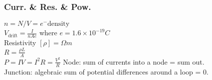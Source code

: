 \subsubsection*{Curr. \& Res. \& Pow.}
$n = N/V = e^- \text{density}$\\
$V_\text{drift} = \frac{I}{nAe}$ where $e = 1.6\times 10^{-19}C$\\
Resistivity $[\rho] = \Omega m$\\
$R = \frac{\rho L}{A}$\\
$P = IV = I^2R = \frac{V^2}{R}$
Node: sum of currents into a node = sum out.\\
Junction: algebraic sum of potential differences around a loop = 0.\\
